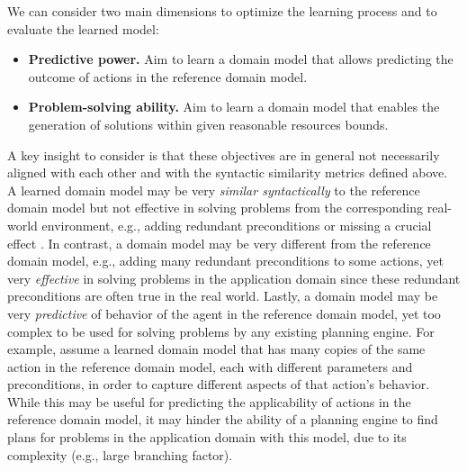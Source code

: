 \documentclass{article}
\theoremstyle{definition}
\theoremstyle{remark}
\newcommand{\mauro}[1]{{\textcolor{green}{[Mauro: #1]}}}
\begin{document}
We can consider two main dimensions to optimize the learning process and to evaluate the learned model:
%
\begin{itemize}
    \item \textbf{Predictive power.} Aim to learn a domain model that allows predicting the outcome of actions in the reference domain model. 
    \item \textbf{Problem-solving ability.} Aim to learn a domain model that enables the generation of solutions within given reasonable resources bounds. %
\end{itemize}


A key insight to consider 
is that these objectives are in general not necessarily aligned with each other and with the syntactic similarity metrics defined above. 
A learned domain model may be very \emph{similar syntactically} to the reference domain model but not effective in solving problems from the corresponding real-world environment, 
e.g., adding redundant preconditions or missing a crucial effect \cite{DBLP:conf/kcap/VallatiC19}. 
In contrast, a domain model may be very different from the reference domain model, e.g., adding many redundant preconditions to some actions, yet very \emph{effective} in solving problems in the application domain since these redundant preconditions are often true in the real world. 
Lastly, a domain model may be very \emph{predictive} of behavior of the agent in the reference domain model, yet too complex to be used for solving problems by any existing planning engine. 
For example, assume a learned domain model that has many copies of the same action in the reference domain model, each with different parameters and preconditions, in order to capture different aspects of that action's behavior. 
While this may be useful for predicting the applicability of actions in the reference domain model, 
it may hinder the ability of a planning engine to find plans for problems in the application domain with this model, due to its complexity (e.g., large branching factor). 
\end{document}
